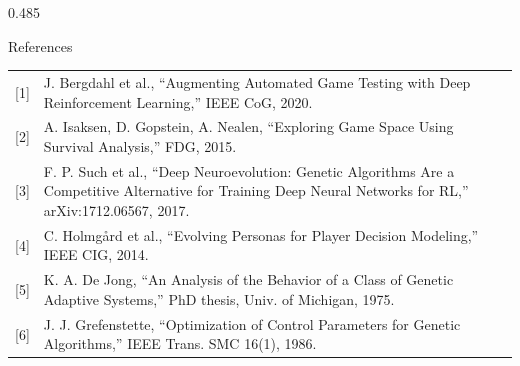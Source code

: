 \documentclass[final,t]{beamer}
\begin{document}
\begin{frame}[t]
\begin{columns}[t,totalwidth=\textwidth]
\begin{column}{0.485\textwidth}
\begin{pblock}{References}
  \footnotesize
  \begin{tabularx}{\linewidth}{@{}r@{\ \,}X@{}}
    {[1]} & J. Bergdahl et al., ``Augmenting Automated Game Testing with Deep Reinforcement
            Learning,'' IEEE CoG, 2020.\\
    {[2]} & A. Isaksen, D. Gopstein, A. Nealen, ``Exploring Game Space Using Survival Analysis,'' FDG, 2015.\\
    {[3]} & F. P. Such et al., ``Deep Neuroevolution: Genetic Algorithms Are a Competitive Alternative
            for Training Deep Neural Networks for RL,'' arXiv:1712.06567, 2017.\\
    {[4]} & C. Holmg\aa{}rd et al., ``Evolving Personas for Player Decision Modeling,'' IEEE CIG, 2014.\\
    {[5]} & K. A. De Jong, ``An Analysis of the Behavior of a Class of Genetic Adaptive Systems,'' PhD
            thesis, Univ. of Michigan, 1975.\\
    {[6]} & J. J. Grefenstette, ``Optimization of Control Parameters for Genetic Algorithms,'' IEEE
            Trans. SMC 16(1), 1986.\\
  \end{tabularx}
\end{pblock}

\end{column}
\end{columns}
\end{frame}
\end{document}
